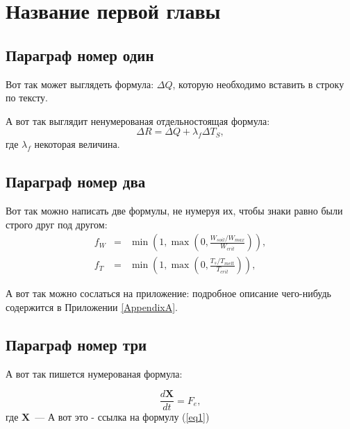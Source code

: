 \chapter{Название первой главы} \label{chapt1}

\section{Параграф номер один} \label{sect1_1}

Вот так может выглядеть формула: $\Delta Q$, которую необходимо вставить в строку по тексту.

А вот так выглядит ненумерованая отдельностоящая формула:
$$
\Delta R = \Delta Q + \lambda_f \Delta T_S,
$$
где $\lambda_f$ некоторая величина.



\section{Параграф номер два} \label{sect1_2_model}

Вот так можно написать две формулы, не нумеруя их, чтобы знаки равно были строго друг под другом:
\begin{eqnarray}\label{plasim25P1}
f_W & = & \min \left( 1, \max \left( 0, \frac{W_{soil} / W_{max}}{W_{crit}} \right)  \right), \nonumber \\
f_T & = & \min \left( 1, \max \left( 0, \frac{T_s / T_{melt}}{T_{crit}} \right)  \right), \nonumber
\end{eqnarray}

А вот так можно сослаться на приложение: подробное описание чего-нибудь содержится в Приложении \ref{AppendixA}.



\section{Параграф номер три} \label{sect1_2}

А вот так пишется нумерованая формула:

\begin{equation}\label{eq1}
\frac{d\textbf{X}}{dt}=F_e,
\end{equation}
где $\textbf{X}$~--- 
А вот это - ссылка на формулу (\ref{eq1})

